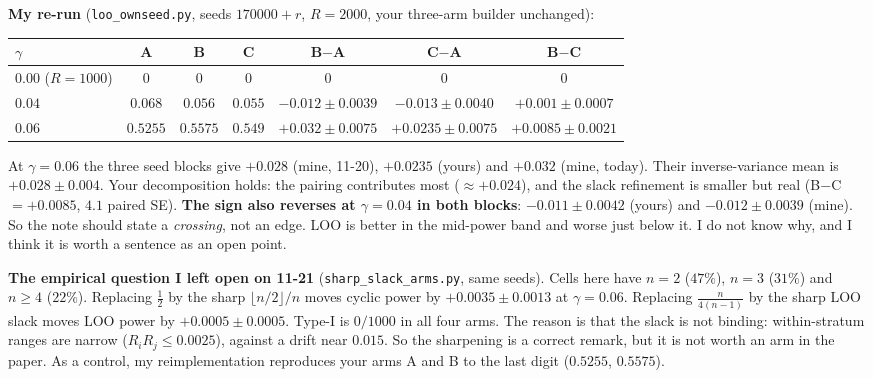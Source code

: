 \documentclass[11pt]{article}
\begin{document}
\textbf{My re-run} (\texttt{loo\_ownseed.py}, seeds $170000+r$, $R=2000$, your three-arm builder unchanged):
\begin{center}\small
\begin{tabular}{lcccccc}
\toprule
$\gamma$ & A & B & C & B$-$A & C$-$A & B$-$C\\
\midrule
$0.00$ ($R=1000$) & $0$ & $0$ & $0$ & $0$ & $0$ & $0$\\
$0.04$ & $0.068$ & $0.056$ & $0.055$ & $-0.012\pm0.0039$ & $-0.013\pm0.0040$ & $+0.001\pm0.0007$\\
$0.06$ & $0.5255$ & $0.5575$ & $0.549$ & $+0.032\pm0.0075$ & $+0.0235\pm0.0075$ & $+0.0085\pm0.0021$\\
\bottomrule
\end{tabular}
\end{center}
At $\gamma=0.06$ the three seed blocks give $+0.028$ (mine, 11-20), $+0.0235$ (yours) and $+0.032$ (mine, today). Their inverse-variance mean is $+0.028\pm0.004$.
Your decomposition holds: the pairing contributes most ($\approx+0.024$), and the slack refinement is smaller but real (B$-$C $=+0.0085$, $4.1$ paired SE).
\textbf{The sign also reverses at $\gamma=0.04$ in both blocks}: $-0.011\pm0.0042$ (yours) and $-0.012\pm0.0039$ (mine). So the note should state a \emph{crossing}, not an edge. LOO is better in the mid-power band and worse just below it. I do not know why, and I think it is worth a sentence as an open point.

\textbf{The empirical question I left open on 11-21} (\texttt{sharp\_slack\_arms.py}, same seeds). Cells here have $n=2$ ($47\%$), $n=3$ ($31\%$) and $n\ge4$ ($22\%$).
Replacing $\frac12$ by the sharp $\lfloor n/2\rfloor/n$ moves cyclic power by $+0.0035\pm0.0013$ at $\gamma=0.06$. Replacing $\frac{n}{4(n-1)}$ by the sharp LOO slack moves LOO power by $+0.0005\pm0.0005$. Type-I is $0/1000$ in all four arms.
The reason is that the slack is not binding: within-stratum ranges are narrow ($R_iR_j\le0.0025$), against a drift near $0.015$. So the sharpening is a correct remark, but it is not worth an arm in the paper.
As a control, my reimplementation reproduces your arms A and B to the last digit ($0.5255$, $0.5575$).
\end{document}
